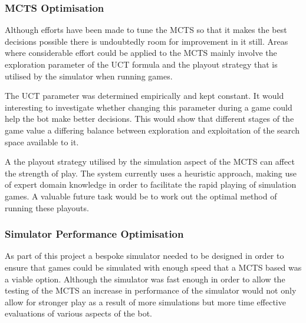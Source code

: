 \documentclass[]{article}
\begin{document}
\subsubsection{MCTS Optimisation}
Although efforts have been made to tune the MCTS so that it makes the best decisions possible there is undoubtedly room for improvement in it still. Areas where considerable effort could be applied to the MCTS mainly involve the exploration parameter of the UCT formula and the playout strategy that is utilised by the simulator when running games. 

The UCT parameter was determined empirically and kept constant. It would interesting to investigate whether changing this parameter during a game could help the bot make better decisions. This would show that different stages of the game value a differing balance between exploration and exploitation of the search space available to it.

A the playout strategy utilised by the simulation aspect of the MCTS can affect the strength of play. The system currently uses a heuristic approach, making use of expert domain knowledge in order to facilitate the rapid playing of simulation games. A valuable future task would be to work out the optimal method of running these playouts. 

\subsubsection{Simulator Performance Optimisation}
As part of this project a bespoke simulator needed to be designed in order to ensure that games could be simulated with enough speed that a MCTS based was a viable option. Although the simulator was fast enough in order to allow the testing of the MCTS an increase in performance of the simulator would not only allow for stronger play as a result of more simulations but more time effective evaluations of various aspects of the bot.

\printbibliography
\end{document}
